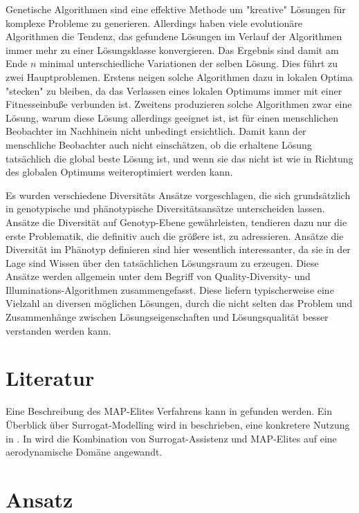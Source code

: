 \documentclass[12pt]{article}
\begin{document}
Genetische Algorithmen sind eine effektive  Methode um "kreative" Lösungen für komplexe Probleme zu generieren.
Allerdings haben viele evolutionäre Algorithmen die Tendenz, das gefundene Lösungen im Verlauf der Algorithmen immer mehr zu einer Lösungsklasse konvergieren.
Das Ergebnis sind damit am Ende $n$ minimal unterschiedliche Variationen der selben Lösung.
Dies führt zu zwei Hauptproblemen. Erstens neigen solche Algorithmen dazu in lokalen Optima "stecken" zu bleiben, da das Verlassen eines lokalen Optimums immer mit einer Fitnesseinbuße verbunden ist.
Zweitens produzieren solche Algorithmen zwar eine Lösung, warum diese Lösung allerdings geeignet ist, ist für einen menschlichen Beobachter im Nachhinein nicht unbedingt ersichtlich.
Damit kann der menschliche Beobachter auch nicht einschätzen, ob die erhaltene Lösung tatsächlich die global beste Lösung ist, und wenn sie das nicht ist wie in Richtung des globalen Optimums weiteroptimiert werden kann.

Es wurden verschiedene Diversitäts Ansätze vorgeschlagen, die sich grundsätzlich in genotypische und phänotypische Diversitätsansätze unterscheiden lassen.
Ansätze die Diversität auf Genotyp-Ebene gewährleisten, tendieren dazu nur die erste Problematik, die definitiv auch die größere ist, zu adressieren.
Ansätze die Diversität im Phänotyp definieren sind hier wesentlich interessanter, da sie in der Lage sind Wissen über den tatsächlichen Lösungsraum zu erzeugen.
Diese Ansätze werden allgemein unter dem Begriff von Quality-Diversity- und Illuminations-Algorithmen zusammengefasst.
Diese liefern typischerweise eine Vielzahl an diversen möglichen Lösungen, durch die nicht selten das Problem und Zusammenhänge zwischen Lösungseigenschaften und Lösungsqualität besser verstanden werden kann.

 
\section{Literatur}

Eine Beschreibung des MAP-Elites Verfahrens kann in \cite{Mouret.4202015} gefunden werden.
Ein Überblick über Surrogat-Modelling wird in \cite{Jin.2011} beschrieben, eine konkretere Nutzung in \cite{Preen.2016}.
In \cite{Gaier.6152018} wird die Kombination von Surrogat-Assistenz und MAP-Elites auf eine aerodynamische Domäne angewandt.
 
\section{Ansatz}
\end{document}
